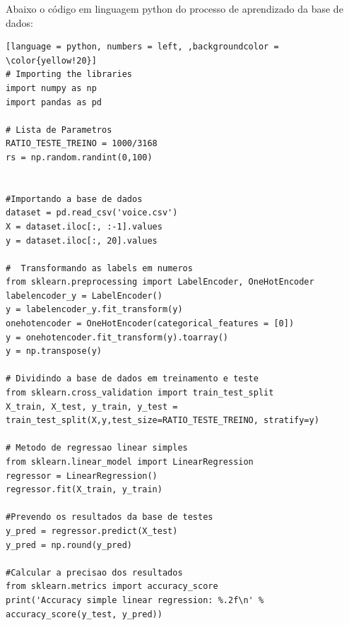 Abaixo o código em linguagem python do processo de aprendizado da base de dados:
\begin{lstlisting}[language = python, numbers = left, ,backgroundcolor = \color{yellow!20}]
# Importing the libraries
import numpy as np
import pandas as pd

# Lista de Parametros
RATIO_TESTE_TREINO = 1000/3168
rs = np.random.randint(0,100)


#Importando a base de dados
dataset = pd.read_csv('voice.csv')
X = dataset.iloc[:, :-1].values
y = dataset.iloc[:, 20].values

#  Transformando as labels em numeros
from sklearn.preprocessing import LabelEncoder, OneHotEncoder
labelencoder_y = LabelEncoder()
y = labelencoder_y.fit_transform(y)
onehotencoder = OneHotEncoder(categorical_features = [0])
y = onehotencoder.fit_transform(y).toarray()
y = np.transpose(y)

# Dividindo a base de dados em treinamento e teste
from sklearn.cross_validation import train_test_split
X_train, X_test, y_train, y_test = train_test_split(X,y,test_size=RATIO_TESTE_TREINO, stratify=y)

# Metodo de regressao linear simples
from sklearn.linear_model import LinearRegression
regressor = LinearRegression()
regressor.fit(X_train, y_train)

#Prevendo os resultados da base de testes
y_pred = regressor.predict(X_test)
y_pred = np.round(y_pred)

#Calcular a precisao dos resultados
from sklearn.metrics import accuracy_score
print('Accuracy simple linear regression: %.2f\n' % accuracy_score(y_test, y_pred))
\end{lstlisting}  